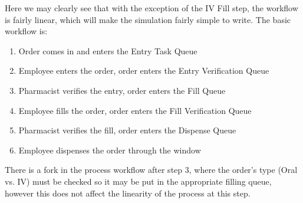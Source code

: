 \documentclass[11pt]{report}            %
\begin{document}
Here we may clearly see that with the exception of the IV Fill step, the workflow is fairly linear, which will make the simulation fairly simple to write. The basic workflow is:
\begin{enumerate}
\item Order comes in and enters the Entry Task Queue
\item Employee enters the order, order enters the Entry Verification Queue
\item Pharmacist verifies the entry, order enters the Fill Queue
\item Employee fills the order, order enters the Fill Verification Queue
\item Pharmacist verifies the fill, order enters the Dispense Queue
\item Employee dispenses the order through the window
\end{enumerate}
There is a fork in the process workflow after step 3, where the order's type (Oral vs. IV) must be checked so it may be put in the appropriate filling queue, however this does not affect the linearity of the process at this step. 
%
%
\end{document}
